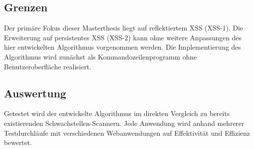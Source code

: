 \subsection{Grenzen}

Der primäre Fokus dieser Masterthesis liegt auf reflektiertem \acl{XSS} (XSS-1). Die Erweiterung auf persistentes \acl{XSS} (XSS-2) kann ohne weitere Anpassungen des hier entwickelten Algorithmus vorgenommen werden. Die Implementierung des Algorithmus wird zunächst als Kommandozeilenprogramm ohne Benutzeroberfläche realisiert.

\subsection{Auswertung}

Getestet wird der entwickelte Algorithmus im direkten Vergleich zu bereits existierenden Schwachstellen-Scannern. Jede Anwendung wird anhand mehrerer Testdurchläufe mit verschiedenen Webanwendungen auf Effektivität und Effizienz bewertet.